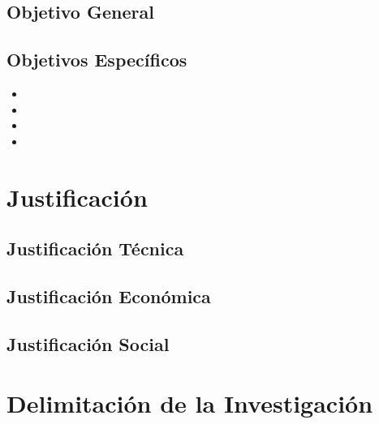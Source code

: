 \documentclass{univalle-perfil}
\begin{document}
\subsection{Objetivo General}


\subsection{Objetivos Específicos}

\begin{itemize}
    \item %
    \item %
    \item %
    \item %
\end{itemize}

\section{Justificación}


\subsection{Justificación Técnica}


\subsection{Justificación Económica}


\subsection{Justificación Social}


\section{Delimitación de la Investigación}
\end{document}
